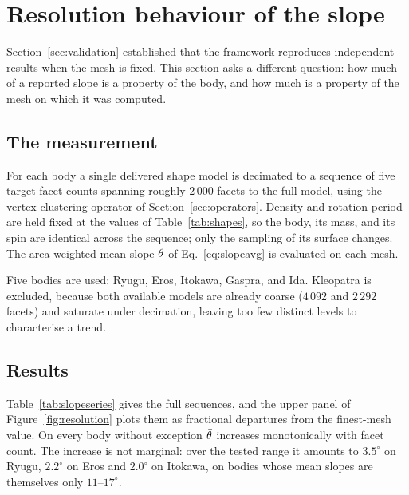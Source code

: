 \section{Resolution behaviour of the slope}
\label{sec:slopesens}

Section~\ref{sec:validation} established that the framework reproduces
independent results when the mesh is fixed. This section asks a different
question: how much of a reported slope is a property of the body, and how much
is a property of the mesh on which it was computed.

\subsection{The measurement}
\label{sec:slopemeas}

For each body a single delivered shape model is decimated to a sequence of five
target facet counts spanning roughly $2\,000$ facets to the full model, using
the vertex-clustering operator of Section~\ref{sec:operators}. Density and
rotation period are held fixed at the values of Table~\ref{tab:shapes}, so the
body, its mass, and its spin are identical across the sequence; only the
sampling of its surface changes. The area-weighted mean slope $\bar{\theta}$ of
Eq.~\eqref{eq:slopeavg} is evaluated on each mesh.

Five bodies are used: Ryugu, Eros, Itokawa, Gaspra, and Ida. Kleopatra is
excluded, because both available models are already coarse ($4\,092$ and
$2\,292$ facets) and saturate under decimation, leaving too few distinct levels
to characterise a trend.

\subsection{Results}
\label{sec:slopesensres}

Table~\ref{tab:slopeseries} gives the full sequences, and the upper panel of
Figure~\ref{fig:resolution} plots them as fractional departures from the
finest-mesh value. On every body without exception $\bar{\theta}$ increases
monotonically with facet count. The increase is
not marginal: over the tested range it amounts to $3.5^{\circ}$ on Ryugu,
$2.2^{\circ}$ on Eros and $2.0^{\circ}$ on Itokawa, on bodies whose mean slopes
are themselves only $11$--$17^{\circ}$.

